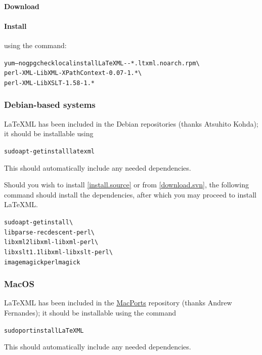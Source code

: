 \documentclass{article}
\begin{document}
\paragraph{Download} \CurrentCentos
\paragraph{Install} using the command:
\begin{alltt}
   yum --nogpgcheck localinstall LaTeXML-\CurrentVersion-*.ltxml.noarch.rpm \textbackslash\\
       perl-XML-LibXML-XPathContext-0.07-1.*   \textbackslash\\
       perl-XML-LibXSLT-1.58-1.*
\end{alltt}

\subsubsection{Debian-based systems}\label{install.debian}
LaTeXML has been included in the Debian repositories (thanks Atsuhito Kohda);
it should be installable using
\begin{alltt}
  sudo apt-get install latexml
\end{alltt}
This should automatically include any needed dependencies.

Should you wish to install \ref{install.source} or from \ref{download.svn}, the
following command should install the dependencies, after which you may proceed to install LaTeXML.
\begin{alltt}
   sudo apt-get install   \textbackslash\\
      libparse-recdescent-perl \textbackslash\\
      libxml2 libxml-libxml-perl \textbackslash\\
      libxslt1.1 libxml-libxslt-perl  \textbackslash\\
      imagemagick perlmagick
\end{alltt}


\subsubsection{MacOS}\label{install.macos}
LaTeXML has been included in the \href{http://www.macports.org}{MacPorts} repository (thanks Andrew Fernandes);
it should be installable using the command
\begin{alltt}
  sudo port install LaTeXML
\end{alltt}
This should automatically include any needed dependencies.
\end{document}
